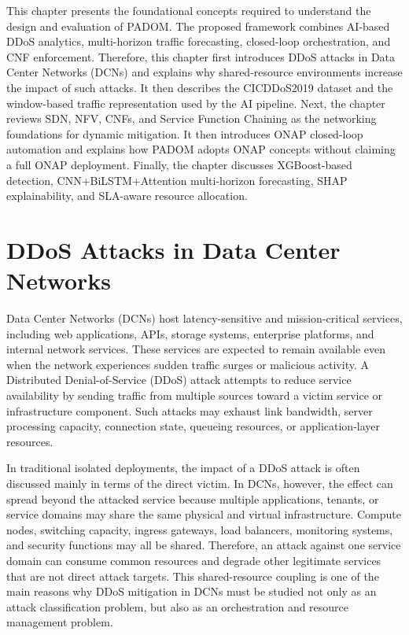 \documentclass[12pt, a4paper, reqno, oneside]{book}
\newcommand{\padonap}{\textsc{PADOM}}
\begin{document}
This chapter presents the foundational concepts required to understand the
design and evaluation of \padonap{}. The proposed framework combines
AI-based DDoS analytics, multi-horizon traffic forecasting, closed-loop
orchestration, and CNF enforcement. Therefore, this chapter first introduces
DDoS attacks in Data Center Networks (DCNs) and
explains why shared-resource environments increase the impact of such attacks.
It then describes the CICDDoS2019 dataset and the window-based traffic
representation used by the AI pipeline. Next, the chapter reviews SDN, NFV,
CNFs, and Service Function Chaining as the networking foundations for dynamic
mitigation. It then introduces ONAP closed-loop automation and explains how
\padonap{} adopts ONAP concepts without claiming a full ONAP deployment.
Finally, the chapter discusses XGBoost-based detection, CNN+BiLSTM+Attention
multi-horizon forecasting, SHAP explainability, and SLA-aware resource
allocation.

\section{DDoS Attacks in Data Center Networks}
\label{sec:ddos-bg}

Data Center Networks (DCNs) host latency-sensitive and mission-critical
services, including web applications, APIs, storage systems, enterprise
platforms, and internal network services. These services are expected to remain
available even when the network experiences sudden traffic surges or malicious
activity. A Distributed Denial-of-Service (DDoS) attack attempts to reduce
service availability by sending traffic from multiple sources toward a victim
service or infrastructure component. Such attacks may exhaust link bandwidth,
server processing capacity, connection state, queueing resources, or
application-layer resources.

In traditional isolated deployments, the impact of a DDoS attack is often
discussed mainly in terms of the direct victim. In DCNs, however, the effect
can spread beyond the attacked service because multiple applications, tenants,
or service domains may share the same physical and virtual infrastructure.
Compute nodes, switching capacity, ingress gateways, load balancers,
monitoring systems, and security functions may all be shared. Therefore, an
attack against one service domain can consume common resources and degrade
other legitimate services that are not direct attack targets. This
shared-resource coupling is one of the main reasons why DDoS mitigation in
DCNs must be studied not only as an attack classification problem, but also as
an orchestration and resource management problem.
\end{document}
